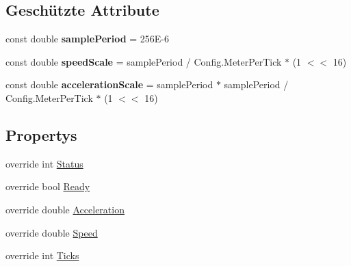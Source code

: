 \subsection*{Geschützte Attribute}
\begin{DoxyCompactItemize}
\item 
\hypertarget{class_robot_ctrl_1_1_motor_ctrl___h_w_a9b2e8f281c704b73014ed11f838dfab5}{
const double {\bfseries samplePeriod} = 256E-\/6}
\label{class_robot_ctrl_1_1_motor_ctrl___h_w_a9b2e8f281c704b73014ed11f838dfab5}

\item 
\hypertarget{class_robot_ctrl_1_1_motor_ctrl___h_w_a054d80af56e02234681d2ad157be9376}{
const double {\bfseries speedScale} = samplePeriod / Config.MeterPerTick $\ast$ (1 $<$$<$ 16)}
\label{class_robot_ctrl_1_1_motor_ctrl___h_w_a054d80af56e02234681d2ad157be9376}

\item 
\hypertarget{class_robot_ctrl_1_1_motor_ctrl___h_w_aae79f545c62e3a7dbbd0efd6d434c68e}{
const double {\bfseries accelerationScale} = samplePeriod $\ast$ samplePeriod / Config.MeterPerTick $\ast$ (1 $<$$<$ 16)}
\label{class_robot_ctrl_1_1_motor_ctrl___h_w_aae79f545c62e3a7dbbd0efd6d434c68e}

\end{DoxyCompactItemize}
\subsection*{Propertys}
\begin{DoxyCompactItemize}
\item 
override int \hyperlink{class_robot_ctrl_1_1_motor_ctrl___h_w_a0c39f88363e68b382cf946f37fe98e16}{Status}
\item 
override bool \hyperlink{class_robot_ctrl_1_1_motor_ctrl___h_w_aa5f0c2dd90cf577ef951e58e957976c9}{Ready}
\item 
override double \hyperlink{class_robot_ctrl_1_1_motor_ctrl___h_w_aeee6ccb14bb1c24c2541c64c0ad91c0e}{Acceleration}
\item 
override double \hyperlink{class_robot_ctrl_1_1_motor_ctrl___h_w_a037b7d7d65571c8eda634bef767a1870}{Speed}
\item 
override int \hyperlink{class_robot_ctrl_1_1_motor_ctrl___h_w_a22603ba1614f7f9eb88f2b7ea0a4c700}{Ticks}
\end{DoxyCompactItemize}


